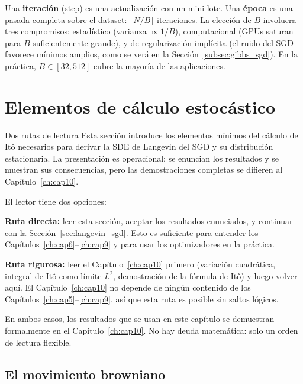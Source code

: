 Una \textbf{iteración} (step) es una actualización con un mini-lote. Una
\textbf{época} es una pasada completa sobre el dataset: $\lceil N/B\rceil$
iteraciones. La elección de $B$ involucra tres compromisos: estadístico
(varianza $\propto 1/B$), computacional (GPUs saturan para $B$
suficientemente grande), y de regularización implícita (el ruido del SGD
favorece mínimos amplios, como se verá en la
Sección~\ref{subsec:gibbs_sgd}). En la práctica, $B \in [32, 512]$ cubre
la mayoría de las aplicaciones.

\section{Elementos de cálculo estocástico}
\label{sec:ito_elementos}


\begin{observacion}{Dos rutas de lectura}
\label{obs:bifurcacion}
Esta sección introduce los elementos mínimos del cálculo de Itô necesarios
para derivar la SDE de Langevin del SGD y su distribución estacionaria. La
presentación es operacional: se enuncian los resultados y se muestran sus
consecuencias, pero las demostraciones completas se difieren al
Capítulo~\ref{ch:cap10}.

El lector tiene dos opciones:

\textbf{Ruta directa:} leer esta sección, aceptar los resultados
enunciados, y continuar con la Sección~\ref{sec:langevin_sgd}. Esto es
suficiente para entender los Capítulos~\ref{ch:cap6}--\ref{ch:cap9} y para
usar los optimizadores en la práctica.

\textbf{Ruta rigurosa:} leer el Capítulo~\ref{ch:cap10} primero (variación
cuadrática, integral de Itô como límite $L^2$, demostración de la fórmula
de Itô) y luego volver aquí. El Capítulo~\ref{ch:cap10} no depende de
ningún contenido de los Capítulos~\ref{ch:cap5}--\ref{ch:cap9}, así que
esta ruta es posible sin saltos lógicos.

En ambos casos, los resultados que se usan en este capítulo se demuestran
formalmente en el Capítulo~\ref{ch:cap10}. No hay deuda matemática: solo un
orden de lectura flexible.
\end{observacion}

\subsection{El movimiento browniano}
\label{subsec:browniano}

